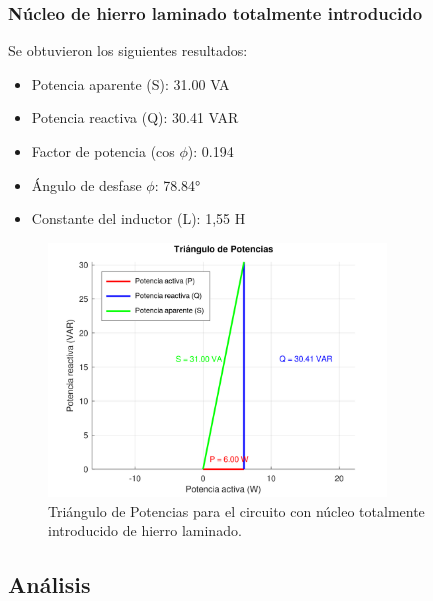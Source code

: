 \documentclass{article}
\begin{document}
                    \subsubsection{Núcleo de hierro laminado totalmente introducido}

                            Se obtuvieron los siguientes resultados:
                        \begin{itemize}
                            \item Potencia aparente (S): 31.00 VA
                            \item Potencia reactiva (Q): 30.41 VAR
                            \item Factor de potencia (cos $\phi$): 0.194
                            \item Ángulo de desfase $\phi$: 78.84°
                            \item Constante del inductor (L): 1,55 H
                        \end{itemize}

                        \begin{figure}[H]
                            \centering
                            \includegraphics[width=0.8\textwidth]{graficoTotalHierroLaminado.png}
                            \caption{Triángulo de Potencias para el circuito con núcleo totalmente introducido de hierro laminado.}
                            \label{fig:graficoTotalHierroLaminado}
                        \end{figure}
            
                        
        \subsection{Análisis}
        
\end{document}
